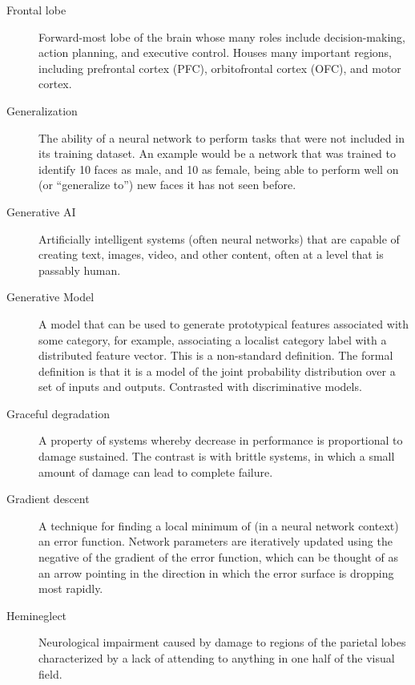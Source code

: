 \begin{description}
\item[Frontal lobe] Forward-most lobe of the brain whose many roles include decision-making, action planning, and executive control. Houses many important regions, including prefrontal cortex (PFC), orbitofrontal cortex (OFC), and motor cortex. 


\item[Generalization] The ability of a neural network to perform tasks that were not included in its training dataset. An example would be a network that was trained to identify 10 faces as male, and 10 as female, being able to perform well on (or ``generalize to'') new faces it has not seen before.

\item[Generative AI] Artificially intelligent systems (often neural networks) that are capable of creating text, images, video, and other content, often at a level that is passably human.

\item[Generative Model] A model that can be used to generate prototypical features associated with some category, for example, associating a localist category label with a distributed feature vector. This is a non-standard definition. The formal definition is that it is a model of the joint probability distribution over a set of inputs and outputs. Contrasted with discriminative models. 

\item[Graceful degradation] A property of systems whereby decrease in performance is proportional to damage sustained. The contrast is with brittle systems, in which a small amount of damage can lead to complete failure.

\item[Gradient descent] A technique for finding a local minimum of (in a neural network context) an error function. Network parameters are iteratively updated using the negative of the gradient of the error function, which can be thought of as an arrow pointing in the direction in which the error surface is dropping most rapidly.


\item[Hemineglect] Neurological impairment caused by damage to regions of the parietal lobes characterized by a lack of attending to anything in one half of the visual field.


\end{description}
